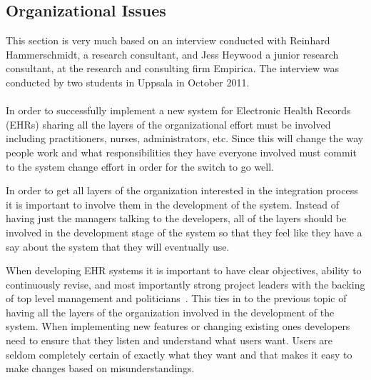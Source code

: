 \documentclass[14pt]{article}
\begin{document}
\subsection{Organizational Issues}
\label{sec:futureOrganizational}
This section is very much based on an interview conducted with Reinhard Hammerschmidt, a research consultant, and Jess Heywood a junior research consultant, at the research and consulting firm Empirica. The interview was conducted by two students in Uppsala in October 2011.
\\\\
In order to successfully implement a new system for Electronic Health Records (\glspl{EHR}) sharing all the layers of the organizational effort must be involved including practitioners, nurses, administrators, etc. Since this will change the way people work and what responsibilities they have everyone involved must commit to the system change effort in order for the switch to go well.

In order to get all layers of the organization interested in the integration process it is important to involve them in the development of the system. Instead of having just the managers talking to the developers, all of the layers should be involved in the development stage of the system so that they feel like they have a say about the system that they will eventually use.

When developing \gls{EHR} systems it is important to have clear objectives, ability to continuously revise, and most importantly strong project leaders with the backing of top level management and politicians~\cite{Empirica}. This ties in to the previous topic of having all the layers of the organization involved in the development of the system. When implementing new features or changing existing ones developers need to ensure that they listen and understand what users want. Users are seldom completely certain of exactly what they want and that makes it easy to make changes based on misunderstandings.
\end{document}
